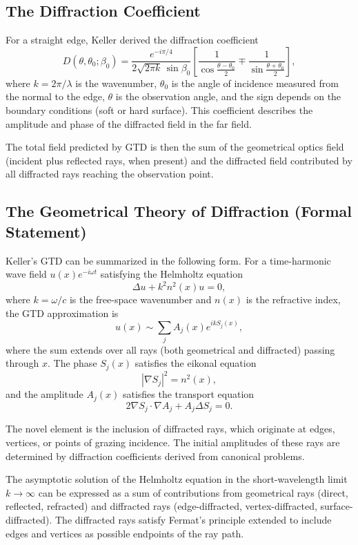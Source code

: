 \subsection{The Diffraction Coefficient}

For a straight edge, Keller derived the diffraction coefficient
\[
D(\theta, \theta_0; \beta_0) = \frac{e^{-i\pi/4}}{2\sqrt{2\pi k}\, \sin\beta_0}
\left[\frac{1}{\cos\frac{\theta-\theta_0}{2}} \mp \frac{1}{\sin\frac{\theta+\theta_0}{2}}\right],
\]
where \(k = 2\pi/\lambda\) is the wavenumber, \(\theta_0\) is the angle of incidence measured from the normal to the edge, \(\theta\) is the observation angle, and the sign depends on the boundary conditions (soft or hard surface). This coefficient describes the amplitude and phase of the diffracted field in the far field.

The total field predicted by GTD is then the sum of the geometrical optics field (incident plus reflected rays, when present) and the diffracted field contributed by all diffracted rays reaching the observation point.

\subsection{The Geometrical Theory of Diffraction (Formal Statement)}

Keller's GTD can be summarized in the following form. For a time-harmonic wave field \(u(x)e^{-i\omega t}\) satisfying the Helmholtz equation
\[
\Delta u + k^2 n^2(x) u = 0,
\]
where \(k = \omega/c\) is the free-space wavenumber and \(n(x)\) is the refractive index, the GTD approximation is
\[
u(x) \sim \sum_j A_j(x) e^{ikS_j(x)},
\]
where the sum extends over all rays (both geometrical and diffracted) passing through \(x\). The phase \(S_j(x)\) satisfies the eikonal equation
\[
|\nabla S_j|^2 = n^2(x),
\]
and the amplitude \(A_j(x)\) satisfies the transport equation
\[
2\nabla S_j \cdot \nabla A_j + A_j \Delta S_j = 0.
\]

The novel element is the inclusion of diffracted rays, which originate at edges, vertices, or points of grazing incidence. The initial amplitudes of these rays are determined by diffraction coefficients derived from canonical problems.

\begin{theorem}
The asymptotic solution of the Helmholtz equation in the short-wavelength limit \(k \to \infty\) can be expressed as a sum of contributions from geometrical rays (direct, reflected, refracted) and diffracted rays (edge-diffracted, vertex-diffracted, surface-diffracted). The diffracted rays satisfy Fermat's principle extended to include edges and vertices as possible endpoints of the ray path.
\end{theorem}

